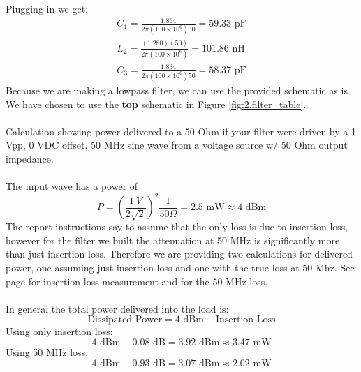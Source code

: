 \documentclass[letterpaper,12pt]{article}
\begin{document}
\noindent
Plugging in we get:
\begin{align*}
    C_1 = \frac{1.864}{2\pi(100\times10^6)50} = 59.33 \text{ pF} \\
    L_2 = \frac{(1.280)(50)}{2\pi(100\times10^6)} = 101.86 \text{ nH} \\
    C_3 = \frac{1.834}{2\pi(100\times10^6)50} = 58.37 \text{ pF}
\end{align*}
Because we are making a lowpass filter, we can use the provided schematic as is. We have chosen to use the \textbf{top} schematic in Figure \ref{fig:2.filter_table}. \\
\\
Calculation showing power delivered to a 50 Ohm if your filter were driven by a 1 Vpp, 0 VDC offset, 50 MHz sine wave from a voltage source w/ 50 Ohm output impedance.\\
\\
The input wave has a power of
$$P=\left(\frac{1 \ V}{2\sqrt{2}}\right)^2 \frac{1}{50 \Omega} = 2.5 \text{ mW} \approx 4 \text{ dBm}$$
The report instructions say to assume that the only loss is due to insertion loss, however for the filter we built the attenuation at 50 MHz is significantly more than just insertion loss. Therefore we are providing two calculations for delivered power, one assuming just insertion loss and one with the true loss at 50 Mhz. See page \pageref{sec:s21_dcstop} for insertion loss measurement and \pageref{sec:s21_pass} for the 50 MHz loss. \\
\\
In general the total power delivered into the load is:
$$\text{Dissipated Power} = 4 \text{ dBm} - \text{Insertion Loss}$$
Using only insertion loss:
$$4 \text{ dBm} - 0.08 \text{ dB} = 3.92 \text{ dBm} \approx 3.47 \text{ mW} $$
Using 50 MHz loss:
$$4 \text{ dBm} - 0.93 \text{ dB} = 3.07 \text{ dBm} \approx 2.02 \text{ mW} $$

\newpage
\end{document}
